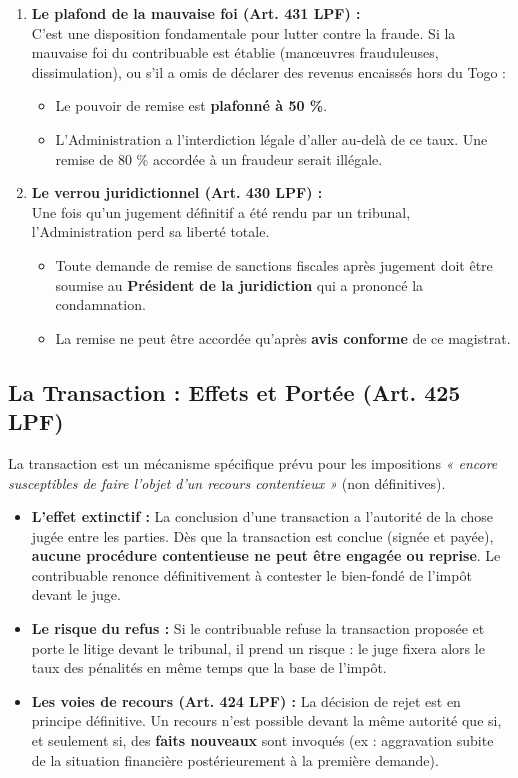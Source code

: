 \documentclass[Cours_contentieuxTF2026.tex]{subfiles}
\begin{document}
 \begin{enumerate}
 	\item \textbf{Le plafond de la mauvaise foi (Art. 431 LPF) :} \\
 	C'est une disposition fondamentale pour lutter contre la fraude. Si la mauvaise foi du contribuable est établie (manœuvres frauduleuses, dissimulation), ou s'il a omis de déclarer des revenus encaissés hors du Togo :
 	\begin{itemize}
 		\item Le pouvoir de remise est \textbf{plafonné à 50 \%}.
 		\item L'Administration a l'interdiction légale d'aller au-delà de ce taux. Une remise de 80 \% accordée à un fraudeur serait illégale.
 	\end{itemize}
 	
 	\item \textbf{Le verrou juridictionnel (Art. 430 LPF) :} \\
 	Une fois qu'un jugement définitif a été rendu par un tribunal, l'Administration perd sa liberté totale.
 	\begin{itemize}
 		\item Toute demande de remise de sanctions fiscales après jugement doit être soumise au \textbf{Président de la juridiction} qui a prononcé la condamnation.
 		\item La remise ne peut être accordée qu'après \textbf{avis conforme} de ce magistrat.
 	\end{itemize}
 \end{enumerate}
 
 \subsection{La Transaction : Effets et Portée (Art. 425 LPF)}
 
 La transaction est un mécanisme spécifique prévu pour les impositions \textit{« encore susceptibles de faire l'objet d'un recours contentieux »} (non définitives).
 
 \begin{itemize}
 	\item \textbf{L'effet extinctif :} La conclusion d'une transaction a l'autorité de la chose jugée entre les parties. Dès que la transaction est conclue (signée et payée), \textbf{aucune procédure contentieuse ne peut être engagée ou reprise}. Le contribuable renonce définitivement à contester le bien-fondé de l'impôt devant le juge.
 	
 	\item \textbf{Le risque du refus :} Si le contribuable refuse la transaction proposée et porte le litige devant le tribunal, il prend un risque : le juge fixera alors le taux des pénalités en même temps que la base de l'impôt.
 	
 	\item \textbf{Les voies de recours (Art. 424 LPF) :} La décision de rejet est en principe définitive. Un recours n'est possible devant la même autorité que si, et seulement si, des \textbf{faits nouveaux} sont invoqués (ex : aggravation subite de la situation financière postérieurement à la première demande).
 \end{itemize}
 
	
\end{document}
